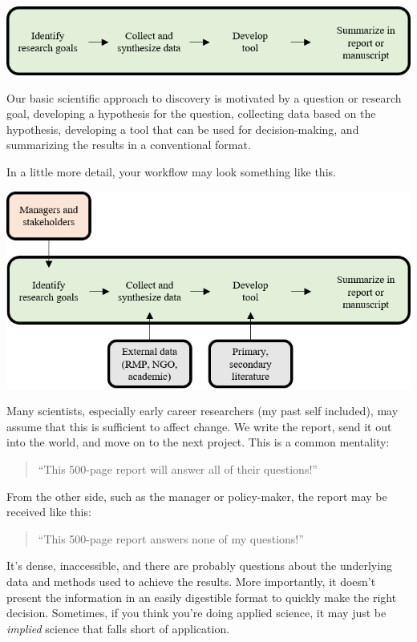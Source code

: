 \documentclass[
  letterpaper,
  DIV=11,
  numbers=noendperiod]{scrreprt}
\begin{document}
\includegraphics{./img/scipro.png}

Our basic scientific approach to discovery is motivated by a question or
research goal, developing a hypothesis for the question, collecting data
based on the hypothesis, developing a tool that can be used for
decision-making, and summarizing the results in a conventional format.

In a little more detail, your workflow may look something like this.

\includegraphics{./img/appscipro.png}

Many scientists, especially early career researchers (my past self
included), may assume that this is sufficient to affect change. We write
the report, send it out into the world, and move on to the next project.
This is a common mentality:

\begin{quote}
``This 500-page report will answer all of their questions!''
\end{quote}

From the other side, such as the manager or policy-maker, the report may
be received like this:

\begin{quote}
``This 500-page report answers none of my questions!''
\end{quote}

It's dense, inaccessible, and there are probably questions about the
underlying data and methods used to achieve the results. More
importantly, it doesn't present the information in an easily digestible
format to quickly make the right decision. Sometimes, if you think
you're doing applied science, it may just be \emph{implied} science that
falls short of application.
\end{document}
